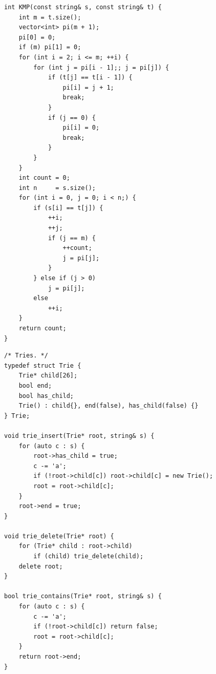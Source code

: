 \documentclass[a4paper,10pt]{article}
\newenvironment{keepfunction}{\begin{samepage}}{\end{samepage}}
\begin{document}
\begin{keepfunction}
\begin{verbatim}
int KMP(const string& s, const string& t) {
    int m = t.size();
    vector<int> pi(m + 1);
    pi[0] = 0;
    if (m) pi[1] = 0;
    for (int i = 2; i <= m; ++i) {
        for (int j = pi[i - 1];; j = pi[j]) {
            if (t[j] == t[i - 1]) {
                pi[i] = j + 1;
                break;
            }
            if (j == 0) {
                pi[i] = 0;
                break;
            }
        }
    }
    int count = 0;
    int n     = s.size();
    for (int i = 0, j = 0; i < n;) {
        if (s[i] == t[j]) {
            ++i;
            ++j;
            if (j == m) {
                ++count;
                j = pi[j];
            }
        } else if (j > 0)
            j = pi[j];
        else
            ++i;
    }
    return count;
}
\end{verbatim}
\end{keepfunction}

\begin{keepfunction}
\begin{verbatim}
/* Tries. */
typedef struct Trie {
    Trie* child[26];
    bool end;
    bool has_child;
    Trie() : child{}, end(false), has_child(false) {}
} Trie;

void trie_insert(Trie* root, string& s) {
    for (auto c : s) {
        root->has_child = true;
        c -= 'a';
        if (!root->child[c]) root->child[c] = new Trie();
        root = root->child[c];
    }
    root->end = true;
}

void trie_delete(Trie* root) {
    for (Trie* child : root->child)
        if (child) trie_delete(child);
    delete root;
}

bool trie_contains(Trie* root, string& s) {
    for (auto c : s) {
        c -= 'a';
        if (!root->child[c]) return false;
        root = root->child[c];
    }
    return root->end;
}
\end{verbatim}
\end{keepfunction}
\end{document}
